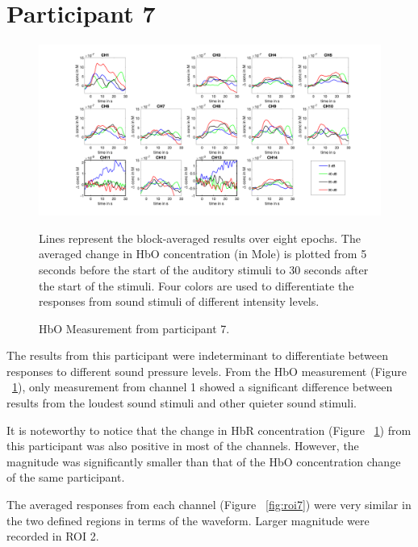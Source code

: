 \section {Participant 7}
\begin{figure}[H]
  \centering
    \includegraphics[scale=.4]{bilder/HbO_Mole/sub_liao_s_HbO.png}
  \caption{HbO Measurement from participant 7.}
  \label{fig:hbo7}
  \medskip
  \footnotesize {Lines represent the block-averaged results over eight epochs. The averaged change in HbO concentration (in Mole) is plotted from 5 seconds before the start of the auditory stimuli to 30 seconds after the start of the stimuli. Four colors are used to differentiate the responses from sound stimuli of different intensity levels.}
\end{figure}

The results from this participant were indeterminant to differentiate between responses to different sound pressure levels. From the HbO measurement (Figure ~\ref{fig:hbo7}), only measurement from channel 1 showed a significant difference between results from the loudest sound stimuli and other quieter sound stimuli. 

It is noteworthy to notice that the change in HbR concentration (Figure ~\ref{fig:hbo7}) from this participant was also positive in most of the channels. However,  the magnitude was significantly smaller than that of the HbO concentration change of the same participant. 

The averaged responses from each channel (Figure ~\ref {fig:roi7}) were very similar in the two defined regions in terms of the waveform. Larger magnitude were recorded in ROI 2.

\newpage



